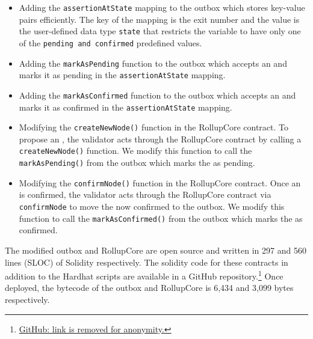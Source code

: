 \begin{itemize}
\item Adding the \texttt{assertionAtState} mapping to the outbox which stores key-value pairs efficiently. The key of the mapping is the exit number and the value is the user-defined data type \texttt{state} that restricts the variable to have only one of the \texttt{pending and confirmed} predefined values.
\item Adding the \texttt{markAsPending} function to the outbox which accepts an \rblock and marks it as pending in the \texttt{assertionAtState} mapping.
\item Adding the \texttt{markAsConfirmed} function to the outbox which accepts an \rblock and marks it as confirmed in the \texttt{assertionAtState} mapping.
\item Modifying the \texttt{createNewNode()} function in the RollupCore contract. To propose an \rblock, the validator acts through the RollupCore contract by calling a \texttt{createNewNode()} function. We modify this function to call the \texttt{markAsPending()} from the outbox which marks the \rblock as pending.
\item Modifying the \texttt{confirmNode()} function in the RollupCore contract. Once an \rblock is confirmed, the validator acts through the RollupCore contract via \texttt{confirmNode} to move the now confirmed \rblock to the outbox. We modify this function to call the \texttt{markAsConfirmed()} from the outbox which marks the \rblock as confirmed.
\end{itemize}

The modified outbox and RollupCore are open source and written in 297 and 560  lines (SLOC) of Solidity respectively. The solidity code for these contracts in addition to the Hardhat scripts are available in a GitHub repository.\footnote{\href{https://}{GitHub: link is removed for anonymity.}} Once deployed, the bytecode of the outbox and RollupCore is 6,434 and 3,099 bytes respectively.





